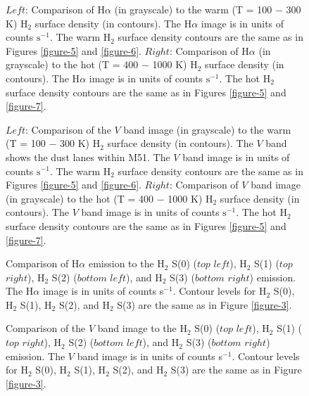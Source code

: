 \documentclass[12pt,preprint]{aastex}
\begin{document}
\clearpage

\begin{figure}
\caption{$Left$: Comparison of  H$\alpha$ (in grayscale) to the warm (T = 100 $-$ 300 K) 
H$_2$ surface density (in contours).  The H$\alpha$ image is in units of counts 
$\mathrm{s^{-1}}$. The warm H$_2$ surface density contours are the same as in 
Figures \ref{figure-5} and \ref{figure-6}.  $Right$: Comparison of H$\alpha$ (in grayscale) 
to the hot (T = 400 $-$ 1000 K) H$_2$ surface density (in contours).  The H$\alpha$ 
image is in units of counts $\mathrm{s^{-1}}$. The hot H$_2$ surface density 
contours are the same as in Figures \ref{figure-5} and \ref{figure-7}.}
\label{figure-11}
\end{figure}

\clearpage

\begin{figure}
\caption{$Left$: Comparison of  the $V$ band image (in grayscale) to the warm (T = 100 $-$ 300 K) 
H$_2$ surface density (in contours).  The $V$ band shows the dust lanes within M51.
The $V$ band image is in units of counts $\mathrm{s^{-1}}$. 
The warm H$_2$ surface density contours are the same as in 
Figures \ref{figure-5} and \ref{figure-6}.  $Right$: Comparison of $V$ band image (in grayscale) 
to the hot (T = 400 $-$ 1000 K) H$_2$ surface density (in contours).  The $V$ band 
image is in units of counts $\mathrm{s^{-1}}$. The hot H$_2$ surface density 
contours are the same as in Figures \ref{figure-5} and \ref{figure-7}.}
\label{figure-12}
\end{figure}

\clearpage

\begin{figure}
\caption{Comparison of H$\alpha$ emission to the H$_2$ S(0) ($top$ $left$),  
H$_2$ S(1) ($top$ $right$),  H$_2$ S(2) ($bottom$ $left$),  and 
H$_2$ S(3) ($bottom$ $right$) emission.  The H$\alpha$ image is in units 
of counts s$^{-1}$.  Contour levels for H$_2$ S(0), H$_2$ S(1), 
H$_2$ S(2), and H$_2$ S(3) are the same as in Figure \ref{figure-3}.}
\label{figure-13}
\end{figure}

\clearpage

\begin{figure}
\caption{Comparison of the $V$ band image to the H$_2$ S(0) ($top$ $left$),  
H$_2$ S(1) ($top$ $right$),  H$_2$ S(2) ($bottom$ $left$),  and 
H$_2$ S(3) ($bottom$ $right$) emission.  The $V$ band image is in units 
of counts s$^{-1}$.  Contour levels for H$_2$ S(0), H$_2$ S(1), 
H$_2$ S(2), and H$_2$ S(3) are the same as in Figure \ref{figure-3}.}
\label{figure-14}
\end{figure}
\end{document}
